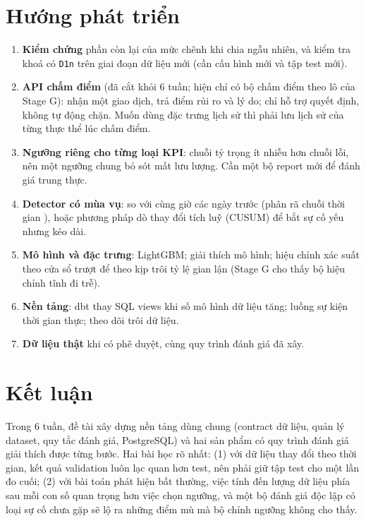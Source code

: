 \documentclass[11pt,a4paper]{article}
\newcommand{\code}[1]{\texttt{\small #1}}
\begin{document}
\section{Hướng phát triển}
\begin{enumerate}
  \item \textbf{Kiểm chứng} phần còn lại của mức chênh khi chia ngẫu nhiên, và kiểm tra khoá có \code{D1n} trên giai đoạn dữ liệu mới (cần cấu hình mới và tập test mới).
  \item \textbf{API chấm điểm} (đã cắt khỏi 6 tuần; hiện chỉ có bộ chấm điểm theo lô của Stage G): nhận một giao dịch, trả điểm rủi ro và lý do; chỉ hỗ trợ quyết định, không tự động chặn. Muốn dùng đặc trưng lịch sử thì phải lưu lịch sử của từng thực thể lúc chấm điểm.
  \item \textbf{Ngưỡng riêng cho từng loại KPI}: chuỗi tỷ trọng ít nhiễu hơn chuỗi lỗi, nên một ngưỡng chung bỏ sót mất lưu lượng. Cần một bộ report mới để đánh giá trung thực.
  \item \textbf{Detector có mùa vụ}: so với cùng giờ các ngày trước (phân rã chuỗi thời gian \cite{fpp}), hoặc phương pháp dò thay đổi tích luỹ (CUSUM) để bắt sự cố yếu nhưng kéo dài.
  \item \textbf{Mô hình và đặc trưng}: LightGBM; giải thích mô hình; hiệu chỉnh xác suất theo cửa sổ trượt để theo kịp trôi tỷ lệ gian lận (Stage G cho thấy bộ hiệu chỉnh tĩnh đi trễ).
  \item \textbf{Nền tảng}: dbt thay SQL views khi số mô hình dữ liệu tăng; luồng sự kiện thời gian thực; theo dõi trôi dữ liệu.
  \item \textbf{Dữ liệu thật} khi có phê duyệt, cùng quy trình đánh giá đã xây.
\end{enumerate}

\section{Kết luận}
Trong 6 tuần, đề tài xây dựng nền tảng dùng chung (contract dữ liệu, quản lý dataset, quy tắc đánh giá, PostgreSQL) và hai sản phẩm có quy trình đánh giá giải thích được từng bước. Hai bài học rõ nhất: (1) với dữ liệu thay đổi theo thời gian, kết quả validation luôn lạc quan hơn test, nên phải giữ tập test cho một lần đo cuối; (2) với bài toán phát hiện bất thường, việc tính đến lượng dữ liệu phía sau mỗi con số quan trọng hơn việc chọn ngưỡng, và một bộ đánh giá độc lập có loại sự cố chưa gặp sẽ lộ ra những điểm mù mà bộ chỉnh ngưỡng không cho thấy.
\end{document}
